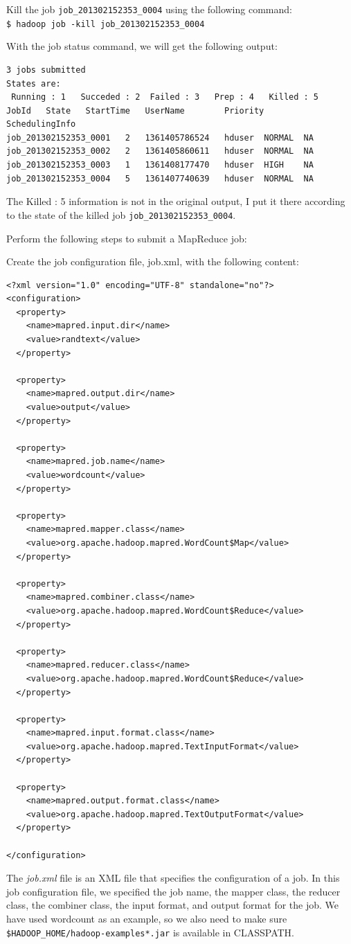 Kill the job \verb|job_201302152353_0004| using the following command: \\
\verb|$ hadoop job -kill job_201302152353_0004|

With the job status command, we will get the following output:
\begin{verbatim}
3 jobs submitted
States are:
 Running : 1   Succeded : 2  Failed : 3   Prep : 4   Killed : 5
JobId   State   StartTime   UserName        Priority        SchedulingInfo
job_201302152353_0001   2   1361405786524   hduser  NORMAL  NA
job_201302152353_0002   2   1361405860611   hduser  NORMAL  NA
job_201302152353_0003   1   1361408177470   hduser  HIGH    NA
job_201302152353_0004   5   1361407740639   hduser  NORMAL  NA
\end{verbatim}

\begin{info}
The Killed : 5 information is not in the original output, I put it there according to the state of the killed job \verb|job_201302152353_0004|.
\end{info}

Perform the following steps to submit a MapReduce job:

Create the job configuration file, job.xml, with the following content:
\begin{verbatim}
<?xml version="1.0" encoding="UTF-8" standalone="no"?>
<configuration>
  <property>
    <name>mapred.input.dir</name>
    <value>randtext</value>
  </property>

  <property>
    <name>mapred.output.dir</name>
    <value>output</value>
  </property>

  <property>
    <name>mapred.job.name</name>
    <value>wordcount</value>
  </property>

  <property>
    <name>mapred.mapper.class</name>
    <value>org.apache.hadoop.mapred.WordCount$Map</value>
  </property>

  <property>
    <name>mapred.combiner.class</name>
    <value>org.apache.hadoop.mapred.WordCount$Reduce</value>
  </property>

  <property>
    <name>mapred.reducer.class</name>
    <value>org.apache.hadoop.mapred.WordCount$Reduce</value>
  </property>

  <property>
    <name>mapred.input.format.class</name>
    <value>org.apache.hadoop.mapred.TextInputFormat</value>
  </property>

  <property>
    <name>mapred.output.format.class</name>
    <value>org.apache.hadoop.mapred.TextOutputFormat</value>
  </property>

</configuration>
\end{verbatim}
The \emph{job.xml} file is an XML file that specifies the configuration of a job. In this job configuration file, we specified the job name, the mapper class, the reducer class, the combiner class, the input format, and output format for the job. We have used wordcount as an example, so we also need to make sure \verb|$HADOOP_HOME/hadoop-examples*.jar| is available in CLASSPATH.


